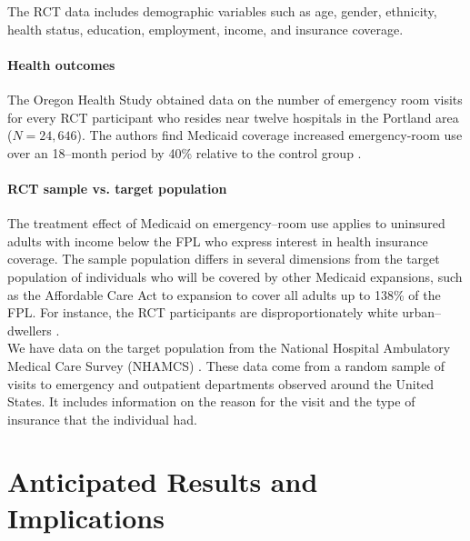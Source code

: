 \documentclass{article}
\begin{document}
The RCT data includes demographic variables such as age, gender, ethnicity, health status, education, employment, income, and insurance coverage. 

\paragraph{Health outcomes} 

The Oregon Health Study obtained data on the number of emergency room visits for every RCT participant who resides near twelve hospitals in the Portland area ($N=24,646$). The authors find Medicaid coverage increased emergency-room use over an 18--month period by 40\% relative to the control group \cite{Taubman}. 
 
\paragraph{RCT sample vs. target population}

The treatment effect of Medicaid on emergency--room use applies to uninsured adults with income below the FPL who express interest in health insurance coverage. The sample population differs in several dimensions from the target population of individuals who will be covered by other Medicaid expansions, such as the Affordable Care Act to expansion to cover all adults up to 138\% of the FPL. For instance, the RCT participants are disproportionately white urban--dwellers \cite{Taubman}. \\
 
We have data on the target population from the National Hospital Ambulatory Medical Care Survey (NHAMCS) \cite{NHAMCS}.  These data come from a random sample of visits to emergency and outpatient departments observed around the United States.  It includes information on the reason for the visit and the type of insurance that the individual had. %

\section{Anticipated Results and Implications}




\end{document}
